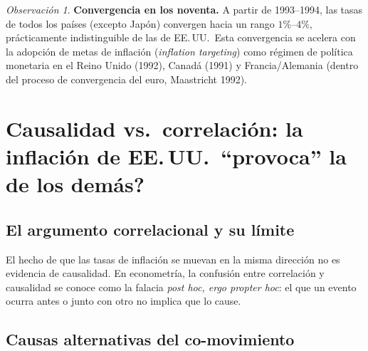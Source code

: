 \documentclass[12pt, letterpaper]{article}
\theoremstyle{remark}
\newtheorem{obs}{Observaci\'on}
\begin{document}
\begin{obs}
  \textbf{Convergencia en los noventa.} A partir de 1993--1994, las tasas
  de todos los pa\'ises (excepto Jap\'on) convergen hacia un rango
  $1\%$--$4\%$, pr\'acticamente indistinguible de las de EE.\,UU.\ Esta
  convergencia se acelera con la adopci\'on de metas de inflaci\'on
  (\textit{inflation targeting}) como r\'egimen de pol\'itica monetaria
  en el Reino Unido (1992), Canad\'a (1991) y Francia/Alemania (dentro
  del proceso de convergencia del euro, Maastricht 1992).
\end{obs}

\section{Causalidad vs.\ correlaci\'on: \textquestiondown{}la inflaci\'on
  de EE.\,UU.\ ``provoca'' la de los dem\'as?}

\subsection{El argumento correlacional y su l\'imite}

El hecho de que las tasas de inflaci\'on se muevan en la misma direcci\'on
no es evidencia de causalidad. En econometr\'ia, la confusi\'on entre
correlaci\'on y causalidad se conoce como la falacia
\textit{post hoc, ergo propter hoc}: el que un evento ocurra antes o junto
con otro no implica que lo cause.

\subsection{Causas alternativas del co-movimiento}
\end{document}
